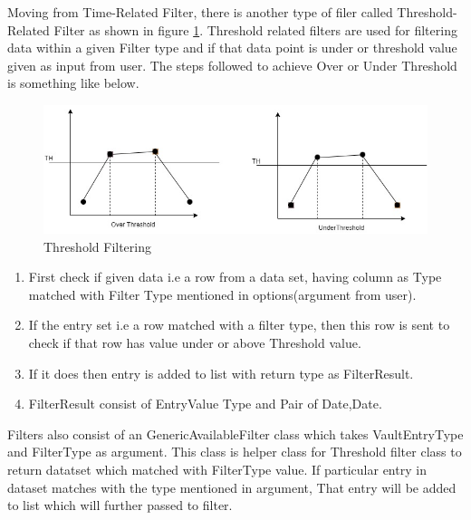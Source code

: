 \documentclass[article,type=msc,colorback,accentcolor=tud9c,twoside,11pt]{tudthesis}
\begin{document}
Moving from Time-Related Filter, there is another type of filer called Threshold-Related Filter as shown in figure \ref{fig:Threshold}. Threshold related filters are used for filtering data within a given Filter type and if that data point is under or threshold value given as input from user. The steps followed to achieve Over or Under Threshold is something like below.
\begin{figure}[h]
	\centering
	\includegraphics[scale=0.7]{Threshold.jpg}
	\caption{Threshold Filtering}
	\label{fig:Threshold}
\end{figure}
\begin{enumerate}
	\item First check if given data i.e a row from a data set, having column as Type matched with Filter Type mentioned in options(argument from user).
	\item If the entry set i.e a row matched with a filter type, then this row is sent to check if that row has value under or above Threshold value.
	\item If it does then entry is added to list with return type as FilterResult.
	\item FilterResult consist of EntryValue Type and Pair of Date,Date.
\end{enumerate}
Filters also consist of an GenericAvailableFilter class which takes VaultEntryType and FilterType as argument. This class is helper class for Threshold filter class to return datatset which matched with FilterType value. If particular entry in dataset matches with the type mentioned in argument, That entry will be added to list which will further passed to filter.
\end{document}
